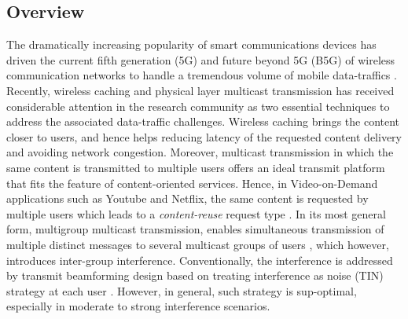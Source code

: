 \documentclass[12pt,draftcls,onecolumn]{IEEEtran}
\theoremstyle{remark}
\theoremstyle{definition}
\begin{document}
\subsection{Overview}
The dramatically increasing popularity of smart communications devices has driven the current fifth generation (5G) and future beyond 5G (B5G) of wireless communication networks to handle a tremendous volume of mobile data-traffics \cite{emr}. Recently, wireless caching and physical layer multicast transmission has received considerable attention in the research community as two essential techniques to address the associated data-traffic challenges. Wireless caching brings the content closer to users, and hence helps reducing latency of the requested content delivery and avoiding network congestion. Moreover, multicast transmission in which the same content is transmitted to multiple users offers an ideal transmit platform that fits the feature of content-oriented services. Hence, in Video-on-Demand applications such as Youtube and Netflix, the same content is requested by multiple users which leads to a \textit{content-reuse} request type \cite{DBLP,8782879,6495773}. In its most general form, multigroup multicast transmission, enables simultaneous transmission of multiple distinct messages to several multicast groups of users \cite{4443878}, which however, introduces inter-group interference. Conventionally, the interference is addressed by transmit beamforming design based on treating interference as noise (TIN) strategy at each user \cite{7925639,7488289,6123786,5074583}. However, in general, such strategy is sup-optimal, especially in moderate to strong interference scenarios.
\end{document}
